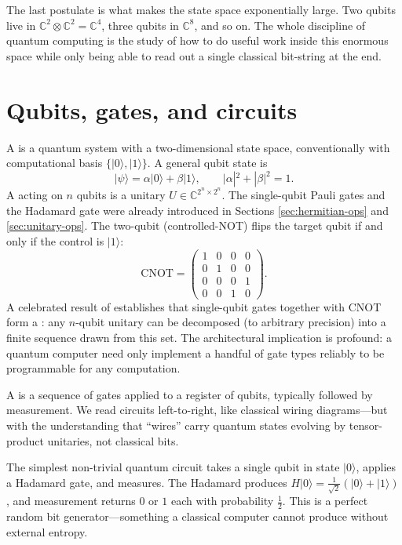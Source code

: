 The last postulate is what makes the state space exponentially large. Two qubits live in $\mathbb{C}^2\otimes\mathbb{C}^2 = \mathbb{C}^4$, three qubits in $\mathbb{C}^8$, and so on. The whole discipline of quantum computing is the study of how to do useful work inside this enormous space while only being able to read out a single classical bit-string at the end.

\section{Qubits, gates, and circuits}

A  is a quantum system with a two-dimensional state space, conventionally with computational basis $\{|0\rangle, |1\rangle\}$. A general qubit state is
\[
  |\psi\rangle = \alpha|0\rangle + \beta|1\rangle, \qquad |\alpha|^2 + |\beta|^2 = 1.
\]
A  acting on $n$ qubits is a unitary $U \in \mathbb{C}^{2^n\times 2^n}$. The single-qubit Pauli gates and the Hadamard gate were already introduced in Sections \ref{sec:hermitian-ops} and \ref{sec:unitary-ops}. The two-qubit  (controlled-NOT) flips the target qubit if and only if the control is $|1\rangle$:
\[
  \mathrm{CNOT} = \begin{pmatrix} 1 & 0 & 0 & 0 \\ 0 & 1 & 0 & 0 \\ 0 & 0 & 0 & 1 \\ 0 & 0 & 1 & 0 \end{pmatrix}.
\]
A celebrated result of \citet{barenco_elementary_1995} establishes that single-qubit gates together with CNOT form a : any $n$-qubit unitary can be decomposed (to arbitrary precision) into a finite sequence drawn from this set. The architectural implication is profound: a quantum computer need only implement a handful of gate types reliably to be programmable for any computation.

A  is a sequence of gates applied to a register of qubits, typically followed by measurement. We read circuits left-to-right, like classical wiring diagrams---but with the understanding that ``wires'' carry quantum states evolving by tensor-product unitaries, not classical bits.

\begin{example}
The simplest non-trivial quantum circuit takes a single qubit in state $|0\rangle$, applies a Hadamard gate, and measures. The Hadamard produces $H|0\rangle = \frac{1}{\sqrt 2}(|0\rangle+|1\rangle)$, and measurement returns $0$ or $1$ each with probability $\tfrac12$. This is a perfect random bit generator---something a classical computer cannot produce without external entropy.
\end{example}

